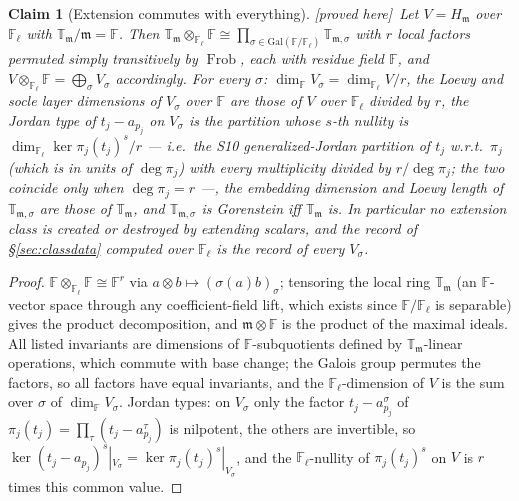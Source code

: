 \documentclass[11pt]{article}
\newtheorem{claim}[theorem]{Claim}
\theoremstyle{remark}
\newcommand{\F}{\mathbb{F}}
\newcommand{\Fl}{\F_\ell}
\DeclareMathOperator{\Frob}{Frob}
\newcommand{\T}{\mathbb{T}}
\newcommand{\m}{\mathfrak{m}}
\newcommand{\PROVED}{\textsf{[proved here]}}
\begin{document}
\begin{claim}[Extension commutes with everything]\label{cl:split}\PROVED\
Let $V=H_\m$ over $\Fl$ with $\T_\m/\m=\F$. Then $\T_\m\otimes_{\Fl}\F\cong\prod_{\sigma\in\mathrm{Gal}(\F/\Fl)}\T_{\m,\sigma}$
with $r$ local factors permuted simply transitively by $\Frob$, each with residue field $\F$,
and $V\otimes_{\Fl}\F=\bigoplus_\sigma V_\sigma$ accordingly. For every $\sigma$:
$\dim_\F V_\sigma=\dim_{\Fl}V/r$, the Loewy and socle layer dimensions of $V_\sigma$ over $\F$
are those of $V$ over $\Fl$ divided by $r$, the Jordan type of $t_j-a_{p_j}$ on $V_\sigma$ is the
partition whose $s$-th nullity is $\dim_{\Fl}\ker\pi_j(t_j)^s/r$ --- i.e.\ the S10
generalized-Jordan partition of $t_j$ w.r.t.\ $\pi_j$ (which is in units of $\deg\pi_j$) with
every multiplicity divided by $r/\deg\pi_j$; the two coincide only when $\deg\pi_j=r$ ---, the
embedding dimension and
Loewy length of $\T_{\m,\sigma}$ are those of $\T_\m$, and $\T_{\m,\sigma}$ is Gorenstein iff
$\T_\m$ is. In particular \emph{no extension class is created or destroyed by extending
scalars}, and the record of \S\ref{sec:classdata} computed over $\Fl$ is the record of every
$V_\sigma$.
\end{claim}
\begin{proof}
$\F\otimes_{\Fl}\F\cong\F^r$ via $a\otimes b\mapsto(\sigma(a)b)_\sigma$; tensoring the local
ring $\T_\m$ (an $\F$-vector space through any coefficient-field lift, which exists since
$\F/\Fl$ is separable) gives the product decomposition, and $\m\otimes\F$ is the product of
the maximal ideals. All listed invariants are dimensions of $\F$-subquotients defined by
$\T_\m$-linear operations, which commute with base change; the Galois group permutes the
factors, so all factors have equal invariants, and the $\Fl$-dimension of $V$ is the sum over
$\sigma$ of $\dim_\F V_\sigma$. Jordan types: on $V_\sigma$ only the factor
$t_j-a^{\sigma}_{p_j}$ of $\pi_j(t_j)=\prod_\tau(t_j-a^{\tau}_{p_j})$ is nilpotent, the others
are invertible, so $\ker(t_j-a_{p_j})^s|_{V_\sigma}=\ker\pi_j(t_j)^s|_{V_\sigma}$, and the
$\Fl$-nullity of $\pi_j(t_j)^s$ on $V$ is $r$ times this common value.
\end{proof}
\end{document}
